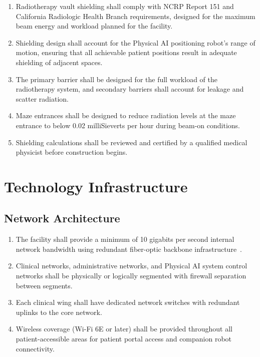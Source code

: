 \documentclass[11pt,letterpaper]{article}
\begin{document}
\begin{enumerate}[label=(\alph*)]
\item Radiotherapy vault shielding shall comply with NCRP Report 151 and
  California Radiologic Health Branch requirements, designed for the maximum
  beam energy and workload planned for the facility.

\item Shielding design shall account for the Physical AI positioning robot's
  range of motion, ensuring that all achievable patient positions result in
  adequate shielding of adjacent spaces.

\item The primary barrier shall be designed for the full workload of the
  radiotherapy system, and secondary barriers shall account for leakage and
  scatter radiation.

\item Maze entrances shall be designed to reduce radiation levels at the maze
  entrance to below 0.02 milliSieverts per hour during beam-on conditions.

\item Shielding calculations shall be reviewed and certified by a qualified
  medical physicist before construction begins.
\end{enumerate}

\section{Technology Infrastructure}

\subsection{Network Architecture}

\begin{enumerate}[label=(\alph*)]
\item The facility shall provide a minimum of 10 gigabits per second internal
  network bandwidth using redundant fiber-optic backbone
  infrastructure~\cite{sitespec2026}.

\item Clinical networks, administrative networks, and Physical AI system control
  networks shall be physically or logically segmented with firewall separation
  between segments.

\item Each clinical wing shall have dedicated network switches with redundant
  uplinks to the core network.

\item Wireless coverage (Wi-Fi 6E or later) shall be provided throughout all
  patient-accessible areas for patient portal access and companion robot
  connectivity.
\end{enumerate}
\end{document}
